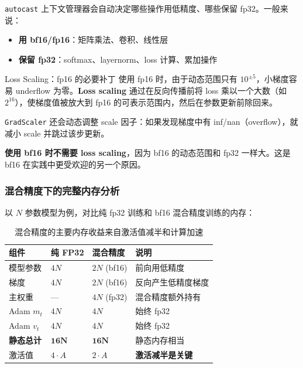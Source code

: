 \texttt{autocast} 上下文管理器会自动决定哪些操作用低精度、哪些保留 fp32。一般来说：
\begin{itemize}
    \item \textbf{用 bf16/fp16}：矩阵乘法、卷积、线性层
    \item \textbf{保留 fp32}：softmax、layernorm、loss 计算、累加操作
\end{itemize}

\begin{warningbox}{Loss Scaling：fp16 的必要补丁}
使用 fp16 时，由于动态范围只有 $10^{\pm 5}$，小梯度容易 underflow 为零。\textbf{Loss scaling} 通过在反向传播前将 loss 乘以一个大数（如 $2^{16}$），使梯度值被放大到 fp16 的可表示范围内，然后在参数更新前除回来。

\texttt{GradScaler} 还会动态调整 scale 因子：如果发现梯度中有 inf/nan（overflow），就减小 scale 并跳过该步更新。

\textbf{使用 bf16 时不需要 loss scaling}，因为 bf16 的动态范围和 fp32 一样大。这是 bf16 在实践中更受欢迎的另一个原因。
\end{warningbox}

\subsubsection{混合精度下的完整内存分析}

以 $N$ 参数模型为例，对比纯 fp32 训练和 bf16 混合精度训练的内存：

\begin{table}[H]
\centering
\begin{tabular}{p{}p{}p{}p{}}
\toprule
\textbf{组件} & \textbf{纯 FP32} & \textbf{混合精度} & \textbf{说明} \\
\midrule
模型参数 & $4N$ & $2N$ (bf16) & 前向用低精度 \\
梯度 & $4N$ & $2N$ (bf16) & 反向产生低精度梯度 \\
主权重 & --- & $4N$ (fp32) & 混合精度额外持有 \\
Adam $m_t$ & $4N$ & $4N$ & 始终 fp32 \\
Adam $v_t$ & $4N$ & $4N$ & 始终 fp32 \\
\midrule
\textbf{静态总计} & $\mathbf{16N}$ & $\mathbf{16N}$ & 静态内存相当 \\
激活值 & $4 \cdot A$ & $2 \cdot A$ & \textbf{激活减半是关键} \\
\bottomrule
\end{tabular}
\caption{混合精度的主要内存收益来自激活值减半和计算加速}
\end{table}

